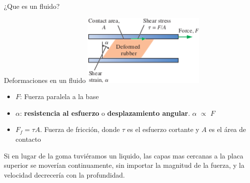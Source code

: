 \documentclass [xcolor=svgnames, t] {beamer}
\begin{document}
\begin{frame}{¿Que es un fluido?}
\href{https://www.youtube.com/watch?v=G53gvVh230U}{}
\end{frame}

\begin{frame}{Deformaciones en un fluido}
\centering
\includegraphics[width=6cm]{fig1}

\begin{itemize}
\item $F$: Fuerza paralela a la base
\item $\alpha$: \textbf{resistencia al esfuerzo} o \textbf{desplazamiento angular}. $\alpha$ $\propto$ $F$
\item $F_f =\tau A$. Fuerza de fricci\'on, donde $\tau$ es el esfuerzo cortante y $A$ es el área de contacto
\end{itemize}
\begin{exampleblock}{}
Si en lugar de la goma tuviéramos un liquido, las capas mas cercanas a la placa superior se moverían continuamente, sin importar la magnitud de la fuerza, y la velocidad decrecería con la profundidad.
\end{exampleblock}
\end{frame}
\end{document}

